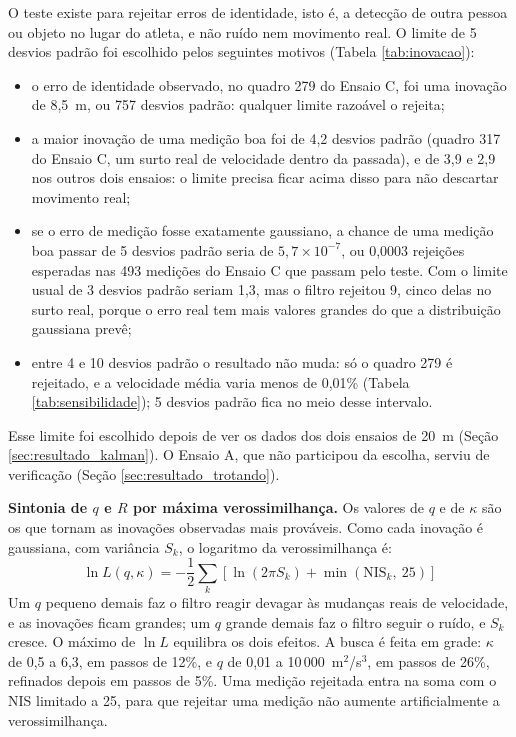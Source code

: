 \documentclass[
    12pt,               %
    openright,          %
    twoside,            %
    a4paper,            %
    chapter=TITLE,      %
    english,            %
    brazil              %
    ]{abntex2}
\begin{document}
O teste existe para rejeitar erros de identidade, isto é, a detecção de outra pessoa ou objeto no lugar do atleta, e não ruído nem movimento real. O limite de 5 desvios padrão foi escolhido pelos seguintes motivos (Tabela \ref{tab:inovacao}):
\begin{itemize}
    \item o erro de identidade observado, no quadro 279 do Ensaio C, foi uma inovação de 8,5~m, ou 757 desvios padrão: qualquer limite razoável o rejeita;
    \item a maior inovação de uma medição boa foi de 4,2 desvios padrão (quadro 317 do Ensaio C, um surto real de velocidade dentro da passada), e de 3,9 e 2,9 nos outros dois ensaios: o limite precisa ficar acima disso para não descartar movimento real;
    \item se o erro de medição fosse exatamente gaussiano, a chance de uma medição boa passar de 5 desvios padrão seria de $5{,}7 \times 10^{-7}$, ou 0,0003 rejeições esperadas nas 493 medições do Ensaio C que passam pelo teste. Com o limite usual de 3 desvios padrão seriam 1,3, mas o filtro rejeitou 9, cinco delas no surto real, porque o erro real tem mais valores grandes do que a distribuição gaussiana prevê;
    \item entre 4 e 10 desvios padrão o resultado não muda: só o quadro 279 é rejeitado, e a velocidade média varia menos de 0,01\% (Tabela \ref{tab:sensibilidade}); 5 desvios padrão fica no meio desse intervalo.
\end{itemize}
Esse limite foi escolhido depois de ver os dados dos dois ensaios de 20~m (Seção \ref{sec:resultado_kalman}). O Ensaio A, que não participou da escolha, serviu de verificação (Seção \ref{sec:resultado_trotando}).

\textbf{Sintonia de $q$ e $R$ por máxima verossimilhança.} Os valores de $q$ e de $\kappa$ são os que tornam as inovações observadas mais prováveis. Como cada inovação é gaussiana, com variância $S_k$, o logaritmo da verossimilhança é:
\begin{equation} \label{eq:kalman_verossimilhanca}
    \ln L(q, \kappa) = -\frac{1}{2} \sum_k \left[ \ln(2\pi S_k) + \min(\mathrm{NIS}_k,\ 25) \right]
\end{equation}
Um $q$ pequeno demais faz o filtro reagir devagar às mudanças reais de velocidade, e as inovações ficam grandes; um $q$ grande demais faz o filtro seguir o ruído, e $S_k$ cresce. O máximo de $\ln L$ equilibra os dois efeitos. A busca é feita em grade: $\kappa$ de 0,5 a 6,3, em passos de 12\%, e $q$ de 0,01 a 10\,000~m$^2$/s$^3$, em passos de 26\%, refinados depois em passos de 5\%. Uma medição rejeitada entra na soma com o NIS limitado a 25, para que rejeitar uma medição não aumente artificialmente a verossimilhança.
\end{document}
